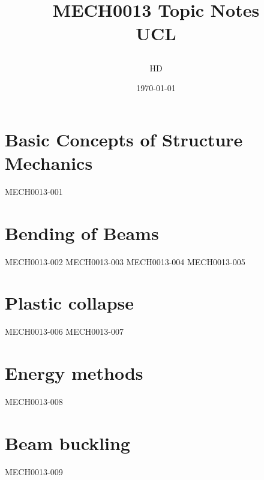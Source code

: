 \documentclass[12pt,a4paper, twoside]{report}
\begin{document}
\title{
  {MECH0013 Topic Notes}\\
  {\large UCL}
  \author{HD}
  \date{\today}
}
\maketitle
\tableofcontents
\chapter{Basic Concepts of Structure Mechanics}
{MECH0013-001}
\chapter{Bending of Beams}
{MECH0013-002}
{MECH0013-003}
{MECH0013-004}
{MECH0013-005}
\chapter{Plastic collapse}
{MECH0013-006}
{MECH0013-007}
\chapter{Energy methods}
{MECH0013-008}
\chapter{Beam buckling}
{MECH0013-009}
\end{document}
